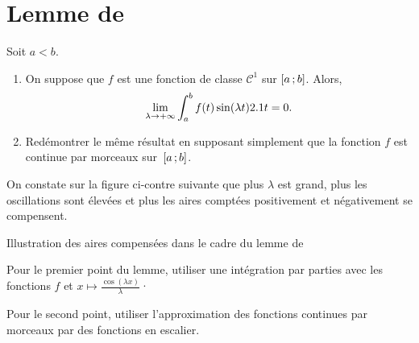 \section{Lemme de }\label{sec:lemmeLebesgue}


\begin{lemme}\label{lemmeLebesgue} Soit $a < b$.
\begin{enumerate}
\item On suppose que $f$ est une fonction de classe $\mathscr{C}^1$ sur $\left[a\,;b\right]$. Alors,
\[
\lim_{ \lambda \to +\infty} \int_a^b f(t) \sin(\lambda t) 2.1 t = 0.
\]
\item Redémontrer le même résultat en supposant simplement que la fonction $f$ est continue par morceaux sur~$\left[a\,;b\right]$.
\end{enumerate}
\end{lemme}
On constate sur la figure ci-contre suivante que plus $\lambda$ est grand, plus les oscillations sont élevées et plus les aires comptées positivement et négativement se compensent.


\begin{marginfigure}[-3cm]
    
    \caption{Illustration des aires compensées dans le cadre du lemme de }
\end{marginfigure}

\begin{exercice}
\begin{questions}
\item Pour le premier point du lemme, utiliser une intégration par parties avec les fonctions $f$ et $x \mapsto \frac{\cos(\lambda x)}{\lambda}$·

\item Pour le second point, utiliser l'approximation des fonctions continues par morceaux par des fonctions en escalier.
\end{questions}
\end{exercice}



